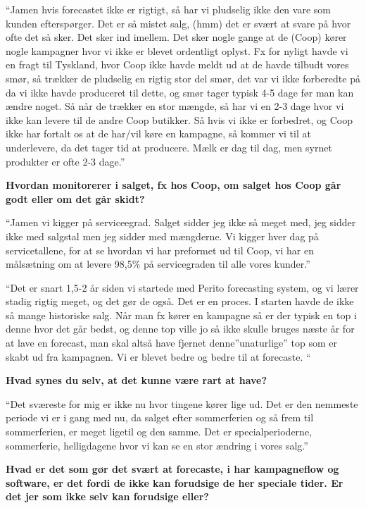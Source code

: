 \documentclass[
  12pt,
  a4paper,
  DIV=11,
  numbers=noendperiod]{scrartcl}
\begin{document}
\begin{itemize}
  ``Jamen hvis forecastet ikke er rigtigt, så har vi pludselig ikke den
  vare som kunden efterspørger. Det er så mistet salg, (hmm) det er
  svært at svare på hvor ofte det så sker. Det sker ind imellem. Det
  sker nogle gange at de (Coop) kører nogle kampagner hvor vi ikke er
  blevet ordentligt oplyst. Fx for nyligt havde vi en fragt til
  Tyskland, hvor Coop ikke havde meldt ud at de havde tilbudt vores
  smør, så trækker de pludselig en rigtig stor del smør, det var vi ikke
  forberedte på da vi ikke havde produceret til dette, og smør tager
  typisk 4-5 dage før man kan ændre noget. Så når de trækker en stor
  mængde, så har vi en 2-3 dage hvor vi ikke kan levere til de andre
  Coop butikker. Så hvis vi ikke er forbedret, og Coop ikke har fortalt
  os at de har/vil køre en kampagne, så kommer vi til at underlevere, da
  det tager tid at producere. Mælk er dag til dag, men syrnet produkter
  er ofte 2-3 dage.''~

  \textbf{Hvordan monitorerer i salget, fx hos Coop, om salget hos Coop
  går godt eller om det går skidt?}~

  ``Jamen vi kigger på serviceegrad. Salget sidder jeg ikke så meget
  med, jeg sidder ikke med salgstal men jeg sidder med mængderne. Vi
  kigger hver dag på servicetallene, for at se hvordan vi har preformet
  ud til Coop, vi har en målsætning om at levere 98,5\% på servicegraden
  til alle vores kunder.''~

  ``Det er snart 1,5-2 år siden vi startede med Perito forecasting
  system, og vi lærer stadig rigtig meget, og det gør de også. Det er en
  proces. I starten havde de ikke så mange historiske salg. Når man fx
  kører en kampagne så er der typisk en top i denne hvor det går bedst,
  og denne top ville jo så ikke skulle bruges næste år for at lave en
  forecast, man skal altså have fjernet denne''unaturlige'' top som er
  skabt ud fra kampagnen. Vi er blevet bedre og bedre til at forecaste.
  ``~

  \textbf{Hvad synes du selv, at det kunne være rart at have?}~

  ``Det sværeste for mig er ikke nu hvor tingene kører lige ud. Det er
  den nemmeste periode vi er i gang med nu, da salget efter sommerferien
  og så frem til sommerferien, er meget ligetil og den samme. Det er
  specialperioderne, sommerferie, helligdagene hvor vi kan se en stor
  ændring i vores salg.''~

  \textbf{Hvad er det som gør det svært at forecaste, i har kampagneflow
  og software, er det fordi de ikke kan forudsige de her speciale tider.
  Er det jer som ikke selv kan forudsige eller?}~


\end{itemize}
\end{document}
